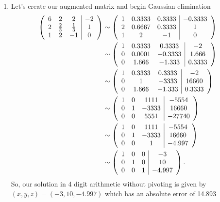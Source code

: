 \documentclass[a4paper,12pt]{article}
\begin{document}
\begin{enumerate}[label = \arabic*.]
\begin{enumerate}[label = (\alph*)]
			\item Let's create our augmented matrix and begin Gaussian elimination
			\begin{align*}
				\left(\begin{array}{c c c | c}
					6 & 2 & 2 & -2 \\
					2 & \frac{2}{3} & \frac{1}{3} & 1\\
					1 & 2 & -1 & 0
				\end{array}\right) 
				&\sim 
				\left(\begin{array}{c c c | c}
					1 & 0.3333 & 0.3333 & -0.3333 \\
					2 & 0.6667 & 0.3333 & 1 \\
					1 & 2 & -1 & 0
				\end{array}\right) \\
				&\sim
				\left(\begin{array}{c c c | c}
					1 & 0.3333 & 0.3333 & -2 \\
					0 & 0.0001 & -0.3333 & 1.666 \\
					0 & 1.666 & -1.333 & 0.3333
				\end{array}\right) \\ 
				&\sim
				\left(\begin{array}{c c c | c}
					1 & 0.3333 & 0.3333 & -2 \\
					0 & 1 & -3333 & 16660 \\
					0 & 1.666 & -1.333 & 0.3333
				\end{array}\right) \\ 
				&\sim
				\left(\begin{array}{c c c | c}
					1 & 0 & 1111 & -5554 \\
					0 & 1 & -3333 & 16660 \\
					0 & 0 & 5551 & -27740
				\end{array}\right) \\ 
				&\sim
				\left(\begin{array}{c c c | c}
					1 & 0 & 1111 & -5554 \\
					0 & 1 & -3333 & 16660 \\
					0 & 0 & 1 & -4.997
				\end{array}\right) \\ 
				&\sim
				\left(\begin{array}{c c c | c}
					1 & 0 & 0 & -3 \\
					0 & 1 & 0 & 10 \\
					0 & 0 & 1 & -4.997
				\end{array}\right). 
			\end{align*}
			So, our solution in 4 digit arithmetic without pivoting is given by $ (x,y,z) = (-3, 10, -4.997) $ which has an absolute error of 14.893
						

\end{enumerate}
\end{enumerate}
\end{document}
